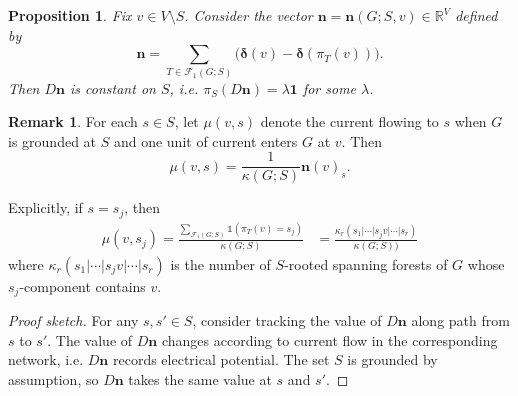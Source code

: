 \documentclass{amsart}
\newtheorem{prop}[thm]{Proposition}
\theoremstyle{definition}
\newtheorem{rmk}[thm]{Remark}
\newcommand{\RR}{\mathbb{R}}
\newcommand{\bolddelta}{\bm{\delta}}
\newcommand{\trees}{\mathcal{F}_1}
\begin{document}
\begin{prop}
\label{prop:n-vector}
Fix $v \in V \setminus S$.
Consider the vector $\mathbf{n} = \mathbf{n}(G;S,v) \in \RR^V$ defined by
\[
	\mathbf{n} = \sum_{T \in \trees(G; S)} 
	\Big( \bolddelta(v) - \bolddelta(\pi_T(v)) \Big) .
\]
Then $D\mathbf{n}$ is constant on $S$, i.e. $\pi_S( D \mathbf{n}) = \lambda \mathbf{1}$ for some $\lambda$.
\end{prop}
\begin{rmk}
For each $s \in S$, let $\mu(v,s)$ denote the current flowing to $s$ when $G$ is grounded at $S$ and one unit of current enters $G$ at $v$.
Then
\[
	\mu(v, s) = \frac{1}{\kappa(G; S)} \mathbf{n}(v)_{s} .
\]
\end{rmk}
Explicitly, if $s = s_j$, then
\begin{align}
	\mu(v, s_j) 
	= \frac{\sum_{\trees(G; S)} \mathds{1}(\pi_T(v) = s_j)}{\kappa(G; S)}
	&= \frac{\kappa_{r}(s_1|\cdots|s_j v| \cdots|s_r)}{\kappa(G; S))} 
\end{align}
where
$\kappa_{r}(s_1|\cdots|s_j v| \cdots|s_r)$ is the number of $S$-rooted spanning forests of $G$ whose $s_j$-component contains $v$.

\begin{proof}[Proof sketch]
For any $s, s' \in S$, consider tracking the value of $D \mathbf{n}$ along path from $s$ to $s'$. 
The value of $D \mathbf{n}$ changes according to current flow in the corresponding network, i.e. $D \mathbf{n}$ records electrical potential.
The set $S$ is grounded by assumption, so $D\mathbf{n}$ takes the same value at $s$ and $s'$.
\end{proof}
\end{document}
